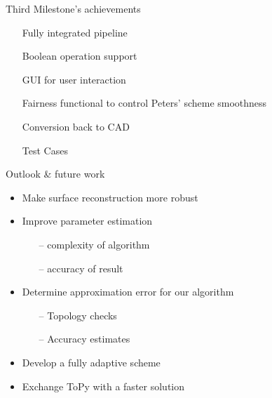\begin{frame}{Third Milestone's achievements}



\begin{itemize}
	\item[\textcolor{green}{\Checkmark}] Fully integrated pipeline 
	
	\item[\textcolor{green}
	{\Checkmark}] Boolean operation support
		
	\item[\textcolor{green}
	{\Checkmark}] GUI for user interaction
	
	\item[\textcolor{green}
	{\Checkmark}] Fairness functional to control Peters' scheme smoothness
	
		\item[\textcolor{green}
	{\Checkmark}] Conversion back to CAD
	
	\item[\textcolor{green}
	{\Checkmark}] Test Cases


\end{itemize}

\end{frame}

\begin{frame}{Outlook \& future work}
\begin{itemize}
\item Make surface reconstruction more robust
\item Improve parameter estimation
\begin{itemize}
\item[--] complexity of algorithm 
\item[--] accuracy of result
\end{itemize}
\item Determine approximation error for our algorithm
\begin{itemize}
\item[--] Topology checks
\item[--] Accuracy estimates
\end{itemize}
\item Develop a fully adaptive scheme
\item Exchange ToPy with a faster solution
\end{itemize}
\end{frame}


